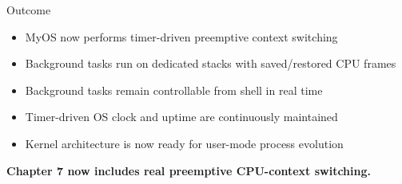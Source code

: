 \documentclass[aspectratio=169]{beamer}
\begin{document}
\begin{frame}{Outcome}
  \begin{itemize}
    \item MyOS now performs timer-driven preemptive context switching
    \item Background tasks run on dedicated stacks with saved/restored CPU frames
    \item Background tasks remain controllable from shell in real time
    \item Timer-driven OS clock and uptime are continuously maintained
    \item Kernel architecture is now ready for user-mode process evolution
  \end{itemize}
  \vspace{8pt}
  \begin{center}
    \Large \textbf{Chapter 7 now includes real preemptive CPU-context switching.}
  \end{center}
\end{frame}
\end{document}
